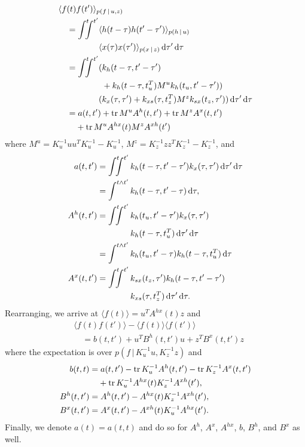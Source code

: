 \documentclass{article}
\newcommand{\tr}{\operatorname{tr}}
\newcommand{\id}[1]{\, \mathrm{d} #1}     %
\newcommand{\cond}{\, | \,}               %
\newcommand{\la}{\langle}
\newcommand{\ra}{\rangle}
\newcommand{\phan}[1]{\hphantom{#1\;}}
\begin{document}
\begin{align*}
    &\la f(t) f(t') \ra_{p(f\cond u,z)} \\
    &\quad= \int^t\!\!\!\!\int^{t'} \la h(t- \tau) h(t' - \tau')\ra_{p(h\cond u)} \\
    &\quad\phan{=\int^t\!\!\!\!\int^{t'}} \la x(\tau) x(\tau') \ra_{p(x\cond z)}\id{\tau'}\id{\tau} \\
    &\quad= \int^t\!\!\!\!\int^{t'} ( k_h(t- \tau,t' - \tau') \\
    &\quad\phan{=\int^t\!\!\!\!\int^{t'} (}+ k_h(t- \tau, t_u^T) M^u k_h(t_u, t' - \tau')) \\
    &\quad\phan{=\int^t\!\!\!\!\int^{t'}}( k_x(\tau,\tau') + k_{xs}(\tau, t_z^T) M^z k_{sx}(t_z, \tau')) \id{\tau'}\id{\tau} \\
    &\quad= a(t,t') + \tr M^u A^{h}(t,t') + \tr M^z A^{x}(t,t') \\
    &\quad\phan{=} + \tr M^u A^{hx}(t) M^z A^{xh}(t')
\end{align*}
where $M^u=K_u^{-1}uu^T K_u^{-1}-K_u^{-1}$, $M^z=K_z^{-1}zz^TK_z^{-1}-K_z^{-1}$, and
\begin{align*}
    a(t,t')&=\int^t\!\!\!\!\int^{t'} k_h(t- \tau,t' - \tau') k_x(\tau,\tau') \id{\tau'}\id{\tau} \\
    &=\int^{t \land t'} k_h(t- \tau,t' - \tau)\id{\tau}, \\
    A^{h}(t,t')&=\int^t\!\!\!\!\int^{t'} k_h(t_{u}, t' - \tau') k_x(\tau,\tau') \\
    &\phan{=\int^t\!\!\!\!\int^{t'}}\, k_h(t- \tau, t_{u}^T) \id{\tau'}\id{\tau}\\
    &=\int^{t \land t'} k_h(t_{u}, t' - \tau)k_h(t- \tau, t_{u}^T) \id{\tau}  \\
    A^{x}(t,t')&=\int^t\!\!\!\!\int^{t'} k_{sx}(t_z, \tau') k_h(t- \tau,t'-\tau') \\
    &\phan{=\int^t\!\!\!\!\int^{t'}}\, k_{xs}(\tau, t_z^T) \id{\tau'}\id{\tau}.
\end{align*}
Rearranging, we arrive at $\la f(t) \ra = u^T  A^{hx}(t) z$ and
\begin{align*}
    &\la f(t) f(t') \ra - \la f(t) \ra \la f(t') \ra \\
    &\quad = b(t,t') + u^T B^{h}(t,t') u + z^T B^{x}(t,t') z
\end{align*}
where the expectation is over $p(f\cond K_u^{-1} u, K_z^{-1} z)$ and
\begin{align*}
    b(t,t) &= a(t,t') - \tr K_u^{-1} A^{h}(t,t') - \tr K_z^{-1}A^{x}(t,t') \\
    &\phan{=} + \tr K_u^{-1}A^{hx}(t)K_z^{-1}A^{xh}(t'), \\
    B^{h}(t,t') &= A^{h}(t,t') - A^{hx}(t)K_z^{-1} A^{xh}(t'), \\
    B^{x}(t,t') &= A^{x}(t,t') - A^{xh}(t)K_u^{-1} A^{hx}(t').
\end{align*}
Finally, we denote $a(t)=a(t,t)$ and do so for $A^h$, $A^x$, $A^{hx}$, $b$, $B^h$, and $B^x$ as well.
\end{document}
